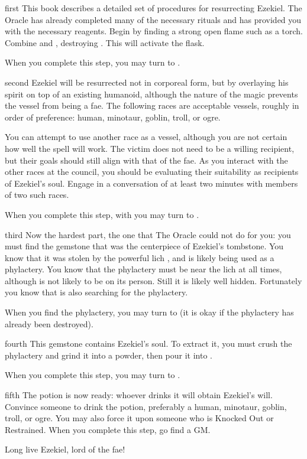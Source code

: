 \documentclass[notebook]{guildcamp2} %
\begin{document}
\startnotebook{\nEzekiel{}}

\begin{page}{first}
This book describes a detailed set of procedures for resurrecting Ezekiel. The Oracle has already completed many of the necessary rituals and 
has provided you with the necessary reagents. Begin by finding a strong open flame such as a torch. Combine \iFlask{} and \iQuintu{}, destroying
\iQuintu{}. This will activate the flask.

When you complete this step, you may turn to .
\end{page}

\begin{page}{second}
Ezekiel will be resurrected not in corporeal form, but by overlaying his spirit on top of an existing humanoid, although the nature of the magic
prevents the vessel from being a fae. The following races are acceptable vessels, roughly in order of preference: human, minotaur, goblin, troll, or ogre.

You can attempt to use another race as a vessel, although you are not certain how well the spell will work.
The victim does not need to be a willing recipient, but their goals should still align with that of the fae.
As you interact with the other races at the council, you should be evaluating their suitability as recipients
of Ezekiel's soul. Engage in a conversation of at least two minutes with members of two such races.

When you complete this step, with you may turn to .
\end{page}

\begin{page}{third}
Now the hardest part, the one that The Oracle could not do for you: you must find the gemstone that was the centerpiece of Ezekiel's tombstone.
You know that it was stolen by the powerful lich \cLich{}, and is likely being used as a phylactery. You know that the phylactery must be near
the lich at all times, although is not likely to be on its person. Still it is likely well hidden. Fortunately you know that \cEnt{\full}
is also searching for the phylactery.

When you find the phylactery, you may turn to  (it is okay if the phylactery has already been destroyed).
\end{page}


\begin{page}{fourth}
This gemstone contains Ezekiel's soul. To extract it, you must crush the phylactery and grind it into a powder, then pour it into \iFlask{}.

When you complete this step, you may turn to .
\end{page}

\begin{page}{fifth}
The potion is now ready: whoever drinks it will obtain Ezekiel's will. Convince someone to drink the potion, preferably a human, minotaur, goblin, troll, or ogre. You may also force it upon someone who is Knocked Out or Restrained. When you complete this step, go find a GM.

Long live Ezekiel, lord of the fae!
\end{page}

\endnotebook
\end{document}
